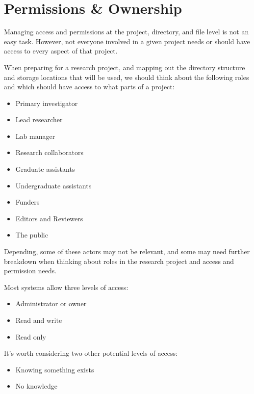 \documentclass[
]{book}
\providecommand{\tightlist}{%
  \setlength{\itemsep}{0pt}\setlength{\parskip}{0pt}}
\begin{document}
\hypertarget{permissions-ownership-1}{%
\chapter*{Permissions \& Ownership}\label{permissions-ownership-1}}

Managing access and permissions at the project, directory, and file level is not an easy task. However, not everyone involved in a given project needs or should have access to every aspect of that project.

When preparing for a research project, and mapping out the directory structure and storage locations that will be used, we should think about the following roles and which should have access to what parts of a project:

\begin{itemize}
\tightlist
\item
  Primary investigator
\item
  Lead researcher
\item
  Lab manager
\item
  Research collaborators
\item
  Graduate assistants
\item
  Undergraduate assistants
\item
  Funders
\item
  Editors and Reviewers
\item
  The public
\end{itemize}

Depending, some of these actors may not be relevant, and some may need further breakdown when thinking about roles in the research project and access and permission needs.

Most systems allow three levels of access:

\begin{itemize}
\tightlist
\item
  Administrator or owner
\item
  Read and write
\item
  Read only
\end{itemize}

It's worth considering two other potential levels of access:

\begin{itemize}
\tightlist
\item
  Knowing something exists
\item
  No knowledge
\end{itemize}
\end{document}
